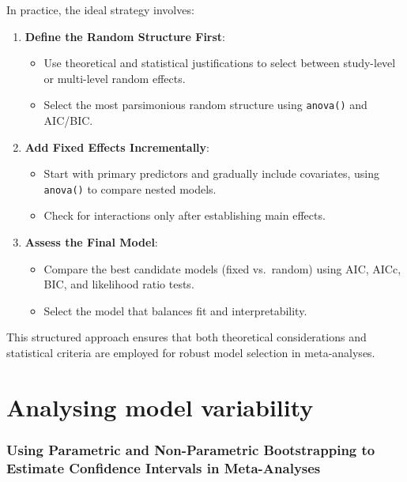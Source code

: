\documentclass[
]{book}
\providecommand{\tightlist}{%
  \setlength{\itemsep}{0pt}\setlength{\parskip}{0pt}}
\begin{document}
In practice, the ideal strategy involves:

\begin{enumerate}
\def\labelenumi{\arabic{enumi}.}
\tightlist
\item
  \textbf{Define the Random Structure First}:

  \begin{itemize}
  \tightlist
  \item
    Use theoretical and statistical justifications to select between study-level or multi-level random effects.
  \item
    Select the most parsimonious random structure using \texttt{anova()} and AIC/BIC.
  \end{itemize}
\item
  \textbf{Add Fixed Effects Incrementally}:

  \begin{itemize}
  \tightlist
  \item
    Start with primary predictors and gradually include covariates, using \texttt{anova()} to compare nested models.
  \item
    Check for interactions only after establishing main effects.
  \end{itemize}
\item
  \textbf{Assess the Final Model}:

  \begin{itemize}
  \tightlist
  \item
    Compare the best candidate models (fixed vs.~random) using AIC, AICc, BIC, and likelihood ratio tests.
  \item
    Select the model that balances fit and interpretability.
  \end{itemize}
\end{enumerate}

This structured approach ensures that both theoretical considerations and statistical criteria are employed for robust model selection in meta-analyses.

\chapter{Analysing model variability}\label{analysing-model-variability}

\subsection{Using Parametric and Non-Parametric Bootstrapping to Estimate Confidence Intervals in Meta-Analyses}\label{using-parametric-and-non-parametric-bootstrapping-to-estimate-confidence-intervals-in-meta-analyses}
\end{document}
